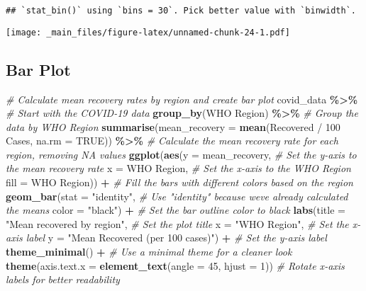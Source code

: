\documentclass[
]{book}
\newenvironment{Shaded}{\begin{snugshade}}{\end{snugshade}}
\newcommand{\AttributeTok}[1]{\textcolor[rgb]{0.13,0.29,0.53}{#1}}
\newcommand{\CommentTok}[1]{\textcolor[rgb]{0.56,0.35,0.01}{\textit{#1}}}
\newcommand{\ConstantTok}[1]{\textcolor[rgb]{0.56,0.35,0.01}{#1}}
\newcommand{\DecValTok}[1]{\textcolor[rgb]{0.00,0.00,0.81}{#1}}
\newcommand{\FunctionTok}[1]{\textcolor[rgb]{0.13,0.29,0.53}{\textbf{#1}}}
\newcommand{\NormalTok}[1]{#1}
\newcommand{\SpecialCharTok}[1]{\textcolor[rgb]{0.81,0.36,0.00}{\textbf{#1}}}
\newcommand{\StringTok}[1]{\textcolor[rgb]{0.31,0.60,0.02}{#1}}
\begin{document}
\begin{verbatim}
## `stat_bin()` using `bins = 30`. Pick better value with `binwidth`.
\end{verbatim}

\texttt{[image: \_main\_files/figure-latex/unnamed-chunk-24-1.pdf]}

\subsection{Bar Plot}\label{bar-plot}

\begin{Shaded}
\begin{Highlighting}[]
\CommentTok{\# Calculate mean recovery rates by region and create bar plot}
\NormalTok{covid\_data }\SpecialCharTok{\%\textgreater{}\%} \CommentTok{\# Start with the COVID{-}19 data}
  \FunctionTok{group\_by}\NormalTok{(}\StringTok{\textasciigrave{}}\AttributeTok{WHO Region}\StringTok{\textasciigrave{}}\NormalTok{) }\SpecialCharTok{\%\textgreater{}\%} \CommentTok{\# Group the data by WHO Region}
  \FunctionTok{summarise}\NormalTok{(}\AttributeTok{mean\_recovery =} \FunctionTok{mean}\NormalTok{(}\StringTok{\textasciigrave{}}\AttributeTok{Recovered / 100 Cases}\StringTok{\textasciigrave{}}\NormalTok{, }\AttributeTok{na.rm =} \ConstantTok{TRUE}\NormalTok{)) }\SpecialCharTok{\%\textgreater{}\%} \CommentTok{\# Calculate the mean recovery rate for each region, removing NA values}
  \FunctionTok{ggplot}\NormalTok{(}\FunctionTok{aes}\NormalTok{(}\AttributeTok{y =}\NormalTok{ mean\_recovery, }\CommentTok{\# Set the y{-}axis to the mean recovery rate}
             \AttributeTok{x =} \StringTok{\textasciigrave{}}\AttributeTok{WHO Region}\StringTok{\textasciigrave{}}\NormalTok{, }\CommentTok{\# Set the x{-}axis to the WHO Region}
             \AttributeTok{fill =} \StringTok{\textasciigrave{}}\AttributeTok{WHO Region}\StringTok{\textasciigrave{}}\NormalTok{)) }\SpecialCharTok{+} \CommentTok{\# Fill the bars with different colors based on the region}
  \FunctionTok{geom\_bar}\NormalTok{(}\AttributeTok{stat =} \StringTok{"identity"}\NormalTok{, }\CommentTok{\# Use "identity" because we\textquotesingle{}ve already calculated the means}
           \AttributeTok{color =} \StringTok{"black"}\NormalTok{) }\SpecialCharTok{+} \CommentTok{\# Set the bar outline color to black}
  \FunctionTok{labs}\NormalTok{(}\AttributeTok{title =} \StringTok{"Mean recovered by region"}\NormalTok{, }\CommentTok{\# Set the plot title}
       \AttributeTok{x =} \StringTok{"WHO Region"}\NormalTok{, }\CommentTok{\# Set the x{-}axis label}
       \AttributeTok{y =} \StringTok{"Mean Recovered (per 100 cases)"}\NormalTok{) }\SpecialCharTok{+} \CommentTok{\# Set the y{-}axis label}
  \FunctionTok{theme\_minimal}\NormalTok{() }\SpecialCharTok{+} \CommentTok{\# Use a minimal theme for a cleaner look}
  \FunctionTok{theme}\NormalTok{(}\AttributeTok{axis.text.x =} \FunctionTok{element\_text}\NormalTok{(}\AttributeTok{angle =} \DecValTok{45}\NormalTok{, }\AttributeTok{hjust =} \DecValTok{1}\NormalTok{)) }\CommentTok{\# Rotate x{-}axis labels for better readability}
\end{Highlighting}
\end{Shaded}
\end{document}
